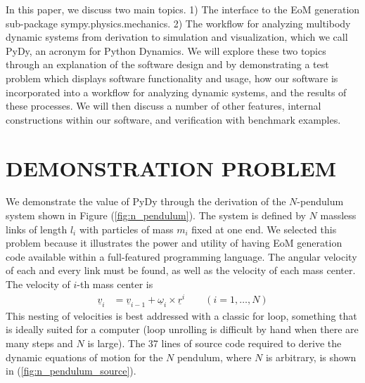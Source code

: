 \documentclass[twocolumn,10pt]{asme2e}
\begin{document}
In this paper, we discuss two main topics. 1) The interface to the EoM
generation sub-package sympy.physics.mechanics. 2) The workflow for analyzing
multibody dynamic systems from derivation to simulation and visualization,
which we call PyDy, an acronym for Python Dynamics. We will explore these two
topics through an explanation of the software design and by demonstrating a
test problem which displays software functionality and usage, how our software
is incorporated into a workflow for analyzing dynamic systems, and the results
of these processes. We will then discuss a number of other features, internal
constructions within our software, and verification with benchmark examples.
\section*{DEMONSTRATION PROBLEM}
We demonstrate the value of PyDy through the derivation of the $N$-pendulum
system shown in Figure (\ref{fig:n_pendulum}).  The system is defined by $N$
massless links of length $l_i$ with particles of mass $m_i$ fixed at one end.
We selected this problem because it illustrates the power and utility of having
EoM generation code available within a full-featured programming language.  The
angular velocity of each and every link must be found, as well as the velocity
of each mass center.  The velocity of $i$-th mass center is
\begin{align*}
\underline{v}_i &= \underline{v}_{i-1} + \underline{\omega}_i \times
\underline{r}^i \qquad (i = 1,\dots,N)
\end{align*}
This nesting of velocities is best addressed with a classic for loop, something
that is ideally suited for a computer (loop unrolling is difficult by hand when
there are many steps and $N$ is large).  The 37 lines of source code required
to derive the dynamic equations of motion for the $N$ pendulum, where $N$ is
arbitrary, is shown in (\ref{fig:n_pendulum_source}).
\end{document}
